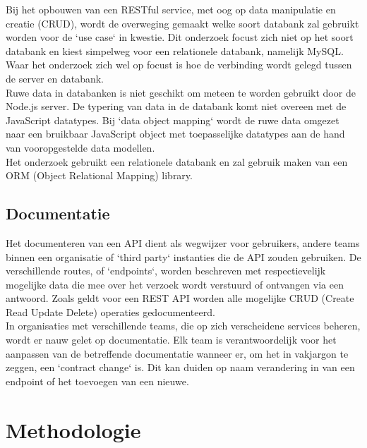 Bij het opbouwen van een RESTful service, met oog op data manipulatie en creatie (CRUD), wordt de overweging gemaakt welke soort databank zal gebruikt worden voor de `use case` in kwestie. Dit onderzoek focust zich niet op het soort databank en kiest simpelweg voor een relationele databank, namelijk MySQL. Waar het onderzoek zich wel op focust is hoe de verbinding wordt gelegd tussen de server en databank. \\
Ruwe data in databanken is niet geschikt om meteen te worden gebruikt door de Node.js server. De typering van data in de databank komt niet overeen met de JavaScript datatypes. Bij `data object mapping` wordt de ruwe data omgezet naar een bruikbaar JavaScript object met toepasselijke datatypes aan de hand van vooropgestelde data modellen. \\
Het onderzoek gebruikt een relationele databank en zal gebruik maken van een ORM (Object Relational Mapping) library.

\subsection{Documentatie}

Het documenteren van een API dient als wegwijzer voor gebruikers, andere teams binnen een organisatie of `third party` instanties die de API zouden gebruiken. De verschillende routes, of `endpoints`, worden beschreven met respectievelijk mogelijke data die mee over het verzoek wordt verstuurd of ontvangen via een antwoord. Zoals geldt voor een REST API worden alle mogelijke CRUD (Create Read Update Delete) operaties gedocumenteerd. \\
In organisaties met verschillende teams, die op zich verscheidene services beheren, wordt er nauw gelet op documentatie. Elk team is verantwoordelijk voor het aanpassen van de betreffende documentatie wanneer er, om het in vakjargon te zeggen, een `contract change` is. Dit kan duiden op naam verandering in van een endpoint of het toevoegen van een nieuwe.

\section{Methodologie}
\label{sec:methodologie}

